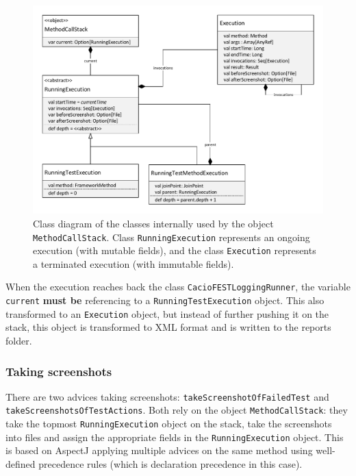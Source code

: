 \begin{figure}[h!]
\centering
  \includegraphics[width=1\textwidth]{images/FESTLogging-MethodCallStack.pdf}
\caption{Class diagram of the classes internally used by the object \texttt{MethodCallStack}. Class \texttt{RunningExecution} represents an ongoing execution (with mutable fields), and the class \texttt{Execution} represents a terminated execution (with immutable fields).}
\label{fig:fest-logging-MethodCallStack}
\end{figure}

When the execution reaches back the class \texttt{CacioFESTLoggingRunner}, the variable \texttt{current} \textbf{must be} referencing to a \texttt{RunningTestExecution} object. This also transformed to an \texttt{Execution} object, but instead of further pushing it on the stack, this object is transformed to XML format and is written to the reports folder.

\subsubsection{Taking screenshots}

There are two advices taking screenshots: \texttt{take\-Screen\-shot\-Of\-Failed\-Test} and \texttt{take\-Screen\-shots\-Of\-Test\-Actions}. Both rely on the object \texttt{MethodCallStack}: they take the topmost \texttt{Running\-Execution} object on the stack, take the screenshots into files and assign the appropriate fields in the \texttt{Running\-Execution} object. This is based on AspectJ applying multiple advices on the same method using well-defined precedence rules (which is declaration precedence in this case).

